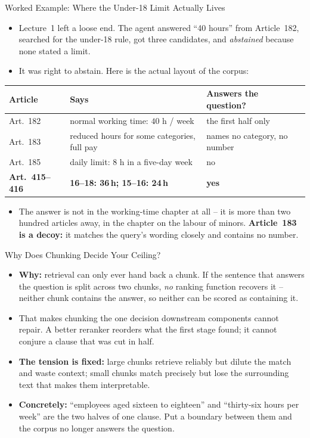 \begin{frame}{Worked Example: Where the Under-18 Limit Actually Lives}
\small
\begin{itemize}
  \item Lecture~1 left a loose end. The agent answered ``40 hours'' from Article~182, searched for the under-18 rule, got three candidates, and \emph{abstained} because none stated a limit.
  \pause
  \item It was right to abstain. Here is the actual layout of the corpus:
\end{itemize}
\pause
\centering
\footnotesize
\begin{tabular}{@{}lll@{}}
\textbf{Article} & \textbf{Says} & \textbf{Answers the question?} \\
\hline
Art.~182 & normal working time: $40$ h / week & the first half only \\
Art.~183 & reduced hours for some categories, full pay & names no category, no number \\
Art.~185 & daily limit: $8$ h in a five-day week & no \\
\textcolor{RLGreen}{\textbf{Art.~415--416}} & \textcolor{RLGreen}{\textbf{16--18: 36\,h; 15--16: 24\,h}} & \textcolor{RLGreen}{\textbf{yes}} \\
\end{tabular}
\pause

\vspace{0.4em}
\small
\begin{itemize}
  \item The answer is not in the working-time chapter at all -- it is more than two hundred articles away, in the chapter on the labour of minors. \textbf{Article~183 is a decoy:} it matches the query's wording closely and contains no number.
\end{itemize}
\end{frame}

\begin{frame}{Why Does Chunking Decide Your Ceiling?}
\begin{itemize}
  \item \textbf{Why:} retrieval can only ever hand back a chunk. If the sentence that answers the question is split across two chunks, \emph{no} ranking function recovers it -- neither chunk contains the answer, so neither can be scored as containing it.
  \pause
  \item That makes chunking the one decision downstream components cannot repair. A better reranker reorders what the first stage found; it cannot conjure a clause that was cut in half.
  \pause
  \item \textbf{The tension is fixed:} large chunks retrieve reliably but dilute the match and waste context; small chunks match precisely but lose the surrounding text that makes them interpretable.
  \pause
  \item \textbf{Concretely:} ``employees aged sixteen to eighteen'' and ``thirty-six hours per week'' are the two halves of one clause. Put a boundary between them and the corpus no longer answers the question.
\end{itemize}
\end{frame}


